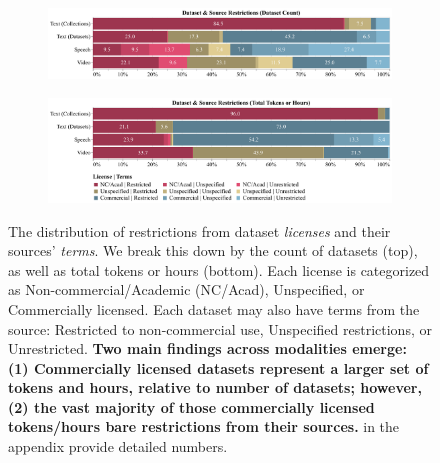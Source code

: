 \begin{figure}[htbp]
    \centering
    \begin{subfigure}[b]{0.99\textwidth}
        \centering
        \includegraphics[width=\linewidth]{figures/license-terms-count.pdf} 
    \end{subfigure}
    \vspace{0.3cm}
    \begin{subfigure}[b]{0.99\textwidth}
        \centering
        \includegraphics[width=\linewidth]{figures/license-terms-hours.pdf} 
    \end{subfigure}
    \caption{The distribution of restrictions from dataset \emph{licenses} and their sources' \emph{terms}. We break this down by the count of datasets (top), as well as total tokens or hours (bottom). 
    Each license is categorized as Non-commercial/Academic (NC/Acad), Unspecified, or Commercially licensed.
    Each dataset may also have terms from the source: Restricted to non-commercial use, Unspecified restrictions, or Unrestricted.
    \textbf{Two main findings across modalities emerge: (1) Commercially licensed datasets represent a larger set of tokens and hours, relative to number of datasets; however, (2) the vast majority of those commercially licensed tokens/hours bare restrictions from their sources.}
     in the appendix provide detailed numbers.}
    \label{fig:license-terms}
    \vspace{-3mm}
\end{figure}


\vspace{-2mm}
